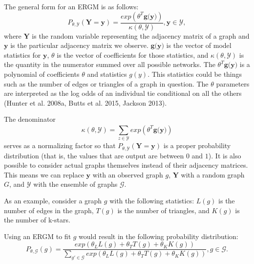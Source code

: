 \documentclass[12pt,twoside]{amherstthesis}
\begin{document}
  The general form for an ERGM is as follows:
  \[P_{\theta, \mathcal{Y}}(\textbf{Y} = \textbf{y}) = \frac {exp(\theta^{T}\textbf{g(y)})} {\kappa(\theta, \mathcal{Y})},\textbf{y} \in \mathcal{Y}, \]
  where \(\textbf{Y}\) is the random variable representing the adjacency
  matrix of a graph and \(\textbf{y}\) is the particular adjacency matrix
  we observe. \(\textbf{g(y)}\) is the vector of model statistics for
  \(\textbf{y}\), \(\theta\) is the vector of coefficients for those
  statistics, and \(\kappa(\theta, \mathcal{Y})\) is the quantity in the
  numerator summed over all possible networks. The
  \(\theta^{T}\textbf{g(y)}\) is a polynomial of coefficients \(\theta\)
  and statistics \(g(y)\). This statistics could be things such as the
  number of edges or triangles of a graph in question. The \(\theta\)
  parameters are interpreted as the log odds of an individual tie
  conditional on all the others (Hunter et al. 2008a, Butts et al. 2015,
  Jackson 2013).
  
  The denominator
  \[\kappa(\theta, \mathcal{Y}) = \sum_{z \in \mathcal{Y}}^{} exp(\theta^{T}\textbf{g(y)})\]
  serves as a normalizing factor so that
  \(P_{\theta, \mathcal{Y}}(\textbf{Y} = \textbf{y})\) is a proper
  probability distribution (that is, the values that are output are
  between \(0\) and \(1\)). It is also possible to consider actual graphs
  themselves instead of their adjacency matrices. This means we can
  replace \(\textbf{y}\) with an observed graph \(g\), \(\textbf{Y}\) with
  a random graph \(G\), and \(\mathcal{Y}\) with the ensemble of graphs
  \(\mathcal{G}\).
  
  As an example, consider a graph \(g\) with the following statistics:
  \(L(g)\) is the number of edges in the graph, \(T(g)\) is the number of
  triangles, and \(K(g)\) is the number of k-stars.
  
  Using an ERGM to fit \(g\) would result in the following probability
  distribution:
  \[P_{\theta, \mathcal{G}}(g) = \frac {exp(\theta_{L}L(g) + \theta_{T}T(g)+\theta_{K}K(g))} {\sum_{g' \in \mathcal{G}}^{} exp(\theta_{L}L(g) + \theta_{T}T(g)+\theta_{K}K(g))}, g \in \mathcal{G}.\]
  
\end{document}
